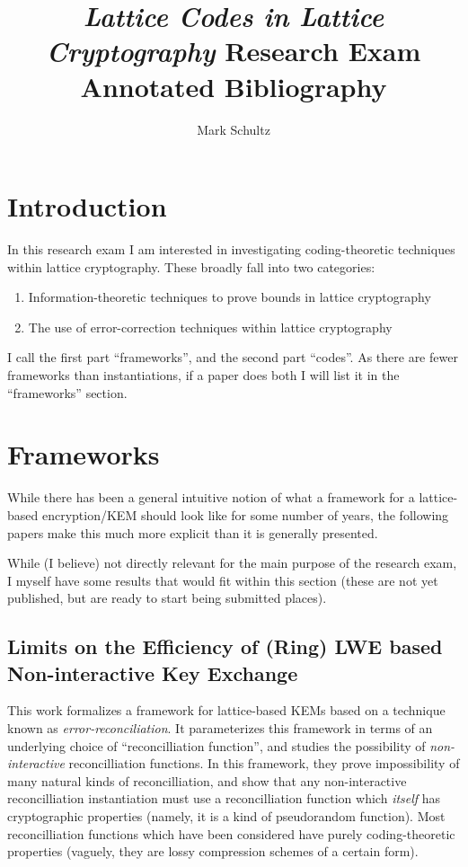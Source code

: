 \documentclass{article}
\begin{document}
	\title{\emph{Lattice Codes in Lattice Cryptography} Research Exam 
	Annotated Bibliography}
	\author{Mark Schultz}
	\maketitle
	\section{Introduction}
	In this research exam I am interested in investigating coding-theoretic techniques within lattice cryptography.
	These broadly fall into two categories:
	\begin{enumerate}
		\item Information-theoretic techniques to prove bounds in lattice cryptography
		\item The use of error-correction techniques within lattice cryptography
	\end{enumerate}
	I call the first part ``frameworks'', and the second part ``codes''.
	As there are fewer frameworks than instantiations, if a paper does both I will list it in the ``frameworks'' section.
	
	\section{Frameworks}
		While there has been a general intuitive notion of what a framework for a lattice-based encryption/KEM should look like for some number of years, the following papers make this much more explicit than it is generally presented.
	
	While (I believe) not directly relevant for the main purpose of the research exam, I myself have some results that would fit within this section (these are not yet published, but are ready to start being submitted places).
	
	\subsection{Limits on the Efficiency of (Ring) LWE based Non-interactive Key Exchange \cite{guo_limits_2020}}
	
	This work formalizes a framework for lattice-based KEMs based on a technique known as \emph{error-reconciliation}.
	It parameterizes this framework in terms of an underlying choice of ``reconcilliation function'', and studies the possibility of \emph{non-interactive} reconcilliation functions.
	In this framework, they prove impossibility of many natural kinds of reconcilliation, and show that any non-interactive reconcilliation instantiation must use a reconcilliation function which \emph{itself} has cryptographic properties (namely, it is a kind of pseudorandom function).
	Most reconcilliation functions which have been considered have purely coding-theoretic properties (vaguely, they are lossy compression schemes of a certain form).
	
\end{document}
